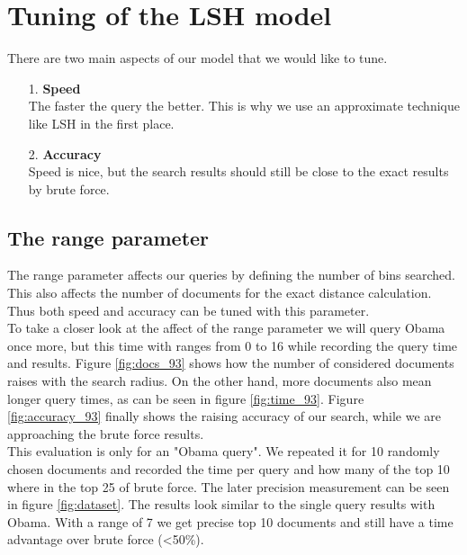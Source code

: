 \documentclass[12pt]{scrreprt}
\begin{document}
\chapter{Tuning of the LSH model}
There are two main aspects of our model that we would like to tune.\\
\begin{center}
\begin{enumerate}
\item[1.] \textbf{Speed}\\
The faster the query the better. This is why we use an approximate technique like LSH in the first place.
\item[2.] \textbf{Accuracy}\\
Speed is nice, but the search results should still be close to the exact results by brute force.
\end{enumerate}
\end{center}

\section{The range parameter}
\label{sec:range}
The range parameter affects our queries by defining the number of bins searched. This also affects the number of documents for the exact distance calculation. Thus both speed and accuracy can be tuned with this parameter.\\

To take a closer look at the affect of the range parameter we will query Obama once more, but this time with ranges from 0 to 16 while recording the query time and results. Figure \ref{fig:docs_93} shows how the number of considered documents raises with the search radius. On the other hand, more documents also mean longer query times, as can be seen in figure \ref{fig:time_93}. Figure \ref{fig:accuracy_93} finally shows the raising accuracy of our search, while we are approaching the brute force results.\\

This evaluation is only for an "Obama query". We repeated it for 10 randomly chosen documents and recorded the time per query and how many of the top 10 where in the top 25 of brute force. The later precision measurement can be seen in figure \ref{fig:dataset}. The results look similar to the single query results with Obama. With a range of 7 we get precise top 10 documents and still have a time advantage over brute force (<50\%).\\
\end{document}
